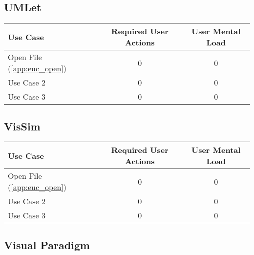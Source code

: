 \subsection{UMLet}

\begin{tabularx}{\textwidth}{Xcc}
\textbf{Use Case} & \textbf{Required User Actions} & \textbf{User Mental Load}\\
\hline
Open File (\ref{app:euc_open}) & 0 & 0 \\
Use Case 2                     & 0 & 0 \\
Use Case 3                     & 0 & 0
\end{tabularx}

\subsection{VisSim}

\begin{tabularx}{\textwidth}{Xcc}
\textbf{Use Case} & \textbf{Required User Actions} & \textbf{User Mental Load}\\
\hline
Open File (\ref{app:euc_open}) & 0 & 0 \\
Use Case 2                     & 0 & 0 \\
Use Case 3                     & 0 & 0
\end{tabularx}

\subsection{Visual Paradigm}




